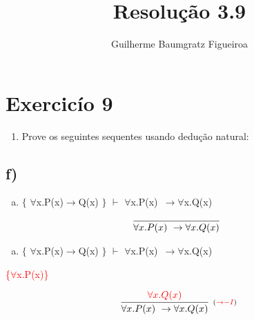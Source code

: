 \documentclass[aspectratio=43]{beamer}
\title[\sc{Resolu\c c\~ao}]{Resolu\c c\~ao 3.9}
\author[Guilherme Baumgratz Figueiroa]{Guilherme Baumgratz Figueiroa}
\institute[UFOP]{Universidade Federal de Ouro Preto} %
\date{}
\newcommand{\ria}{$\rightarrow$}
\newcommand{\fall}{$\forall$}
\begin{document}
	
	\begin{frame}
		\titlepage
	\end{frame}
	
	\section{Exercic\'io 9}
	
	\begin{frame}%
    
    	\begin{enumerate}[1.]
			\item Prove os seguintes sequentes usando dedu\c c\~ao natural: \\
		\end{enumerate}
				
	\end{frame}
    \subsection{f)}
    
    \begin{frame}[fragile]
    
    	\begin{enumerate}[f)]
			\item $\{$ \fall x.P(x)\ria Q(x) $\}$ $\vdash$ \fall x.P(x)\ \ria \fall x.Q(x) \\
		\end{enumerate}
        
        \vspace{65pt}
        
        \[
        \begin{array}{c}
		
        	\infer[_{}]
            	{\forall x.P(x)\ \to \forall x.Q(x)}
            	{}
        
		\end{array}
        \]
        
	\end{frame}
    
    \begin{frame}[fragile]
    
    	\begin{enumerate}[f)]
			\item $\{$ \fall x.P(x)\ria Q(x) $\}$ $\vdash$ \fall x.P(x)\ \ria \fall x.Q(x) \\
		\end{enumerate}
        \textcolor{red}{\{\fall x.P(x)\}}
        \vspace{60pt}
        
        \[
        \begin{array}{c}
		
        	\infer[_{(\textcolor{red}{\to -I})}]
            	{\forall x.P(x)\ \to \forall x.Q(x)}
            	{\textcolor{red}{\forall x.Q(x)}}
        
		\end{array}
        \]
        
	\end{frame}
    
\end{document}
